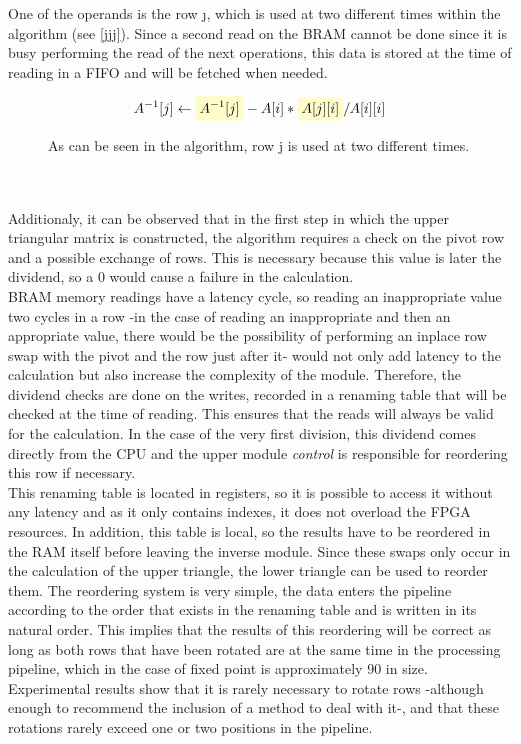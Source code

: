 \pagebreak
One of the operands is the row \j, which is used at two different times within the algorithm (see \autoref{jjj}). Since a second read on the BRAM cannot be done since it is busy performing the read of the next operations, this data is stored at the time of reading in a FIFO and will be fetched when needed.
\newcommand{\highlight}[1]{%
  \colorbox{yellow!20}{$\displaystyle#1$}}
\begin{figure}[h!]
\[A^{-1}[j] \gets \highlight{A^{-1}[j]}-A[i]*\highlight{A[j][i]}/A[i][i]\]
\caption[Data depency in the pipeline]{As can be seen in the algorithm, row j is used at two different times.}
\label{jjj}
\end{figure}
\\
\\
Additionaly, it can be observed that in the first step in which the upper triangular matrix is constructed, the algorithm requires a check on the pivot row and a possible exchange of rows. This is necessary because this value is later the dividend, so a 0 would cause a failure in the calculation.
\\
BRAM memory readings have a latency cycle, so reading an inappropriate value two cycles in a row -in the case of reading an inappropriate and then an appropriate value, there would be the possibility of performing an inplace row swap with the pivot and the row just after it- would not only add latency to the calculation but also increase the complexity of the module. Therefore, the dividend checks are done on the writes, recorded in a renaming table that will be checked at the time of reading. This ensures that the reads will always be valid for the calculation. In the case of the very first division, this dividend comes directly from the CPU and the upper module \textit{control} is responsible for reordering this row if necessary.
\\
This renaming table is located in registers, so it is possible to access it without any latency and as it only contains indexes, it does not overload the FPGA resources. In addition, this table is local, so the results have to be reordered in the RAM itself before leaving the inverse module. Since these swaps only occur in the calculation of the upper triangle, the lower triangle can be used to reorder them. The reordering system is very simple, the data enters the pipeline according to the order that exists in the renaming table and is written in its natural order. This implies that the results of this reordering will be correct as long as both rows that have been rotated are at the same time in the processing pipeline, which in the case of fixed point is approximately 90 in size. Experimental results show that it is rarely necessary to rotate rows -although enough to recommend the inclusion of a method to deal with it-, and that these rotations rarely exceed one or two positions in the pipeline.
